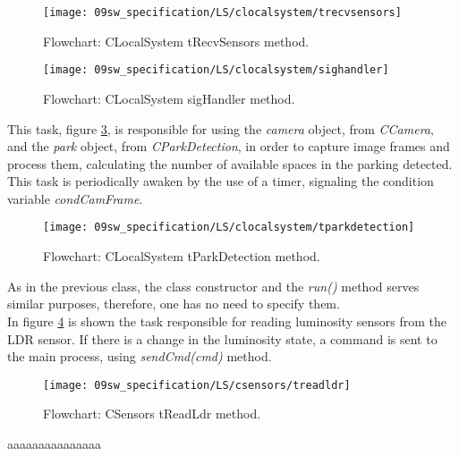 \begin{figure}[H]
	\centering
	\texttt{[image: 09sw\_specification/LS/clocalsystem/trecvsensors]}
	\caption{Flowchart: CLocalSystem tRecvSensors method.}
	\label{fig:CLocalSystemtRecvSensors}
\end{figure}

\begin{figure}[H]
	\centering
	\texttt{[image: 09sw\_specification/LS/clocalsystem/sighandler]}
	\caption{Flowchart: CLocalSystem sigHandler method.}
	\label{fig:CLocalSystemsigHandler}
\end{figure}

\clearpage
This task, figure \ref{fig:CLocalSystemtParkDetection}, is responsible for using the \textit{camera} object, from \textit{CCamera}, and the \textit{park} object, from \textit{CParkDetection}, in order to capture image frames and process them, calculating the number of available spaces in the parking detected. This task is periodically awaken by the use of a timer, signaling the condition variable \textit{condCamFrame}.

\begin{figure}[H]
	\centering
	\texttt{[image: 09sw\_specification/LS/clocalsystem/tparkdetection]}
	\caption{Flowchart: CLocalSystem tParkDetection method.}
	\label{fig:CLocalSystemtParkDetection}
\end{figure}

\clearpage
{}

As in the previous class, the class constructor and the \textit{run()} method serves similar purposes, therefore, one has no need to specify them.\\

In figure \ref{fig:CSensorstreadldr} is shown the task responsible for reading luminosity sensors from the LDR sensor. If there is a change in the luminosity state, a command is sent to the main process, using \textit{sendCmd(cmd)} method.

\begin{figure}[H]
	\centering
	\texttt{[image: 09sw\_specification/LS/csensors/treadldr]}
	\caption{Flowchart: CSensors tReadLdr method.}
	\label{fig:CSensorstreadldr}
\end{figure}

aaaaaaaaaaaaaaa

